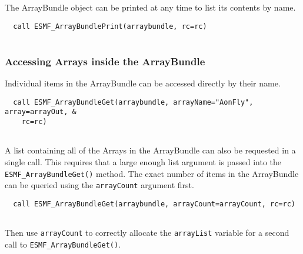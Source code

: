 
   The ArrayBundle object can be printed at any time to list its contents by name. 

 \begin{verbatim}
  call ESMF_ArrayBundlePrint(arraybundle, rc=rc)
 
\end{verbatim}
 

   \subsubsection{Accessing Arrays inside the ArrayBundle}
  
   Individual items in the ArrayBundle can be accessed directly by their
   name. 

 \begin{verbatim}
  call ESMF_ArrayBundleGet(arraybundle, arrayName="AonFly", array=arrayOut, &
    rc=rc)
 
\end{verbatim}
 

   A list containing all of the Arrays in the ArrayBundle can also be requested
   in a single call.
   This requires that a large enough list argument is passed into the
   {\tt ESMF\_ArrayBundleGet()} method. The exact number of items in the
   ArrayBundle can be queried using the {\tt arrayCount} argument first. 

 \begin{verbatim}
  call ESMF_ArrayBundleGet(arraybundle, arrayCount=arrayCount, rc=rc)
 
\end{verbatim}
 

   \begin{sloppypar}
   Then use {\tt arrayCount} to correctly allocate the {\tt arrayList}
   variable for a second call to {\tt ESMF\_ArrayBundleGet()}.
   \end{sloppypar} 

